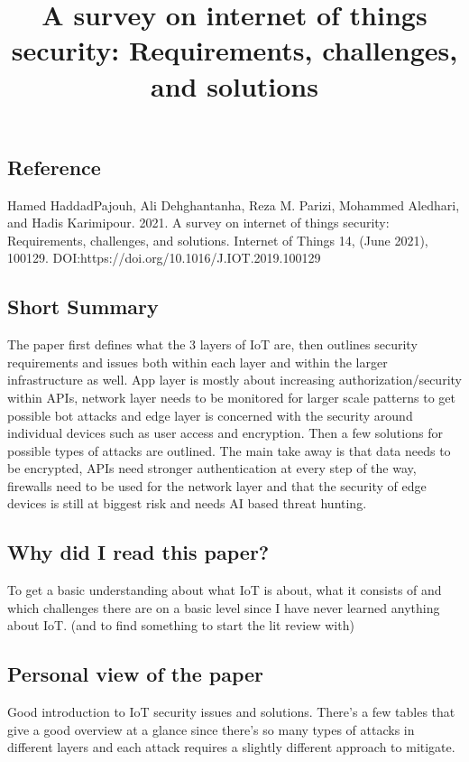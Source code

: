 \documentclass[11pt,a4paper]{article}
\title{A survey on internet of things security: Requirements, challenges, and solutions}
\author{}
\date{}
\begin{document}
\maketitle

\subsection*{Reference}
Hamed HaddadPajouh, Ali Dehghantanha, Reza M. Parizi, Mohammed Aledhari, and Hadis Karimipour. 2021. A survey on internet of things security: Requirements, challenges, and solutions. Internet of Things 14, (June 2021), 100129. DOI:https://doi.org/10.1016/J.IOT.2019.100129

\subsection*{Short Summary} 
The paper first defines what the 3 layers of IoT are, then outlines security requirements and issues both within each layer and within the larger infrastructure as well. App layer is mostly about increasing authorization/security within APIs, network layer needs to be monitored for larger scale patterns to get possible bot attacks and edge layer is concerned with the security around individual devices such as user access and encryption. Then a few solutions for possible types of attacks are outlined. The main take away is that data needs to be encrypted, APIs need stronger authentication at every step of the way, firewalls need to be used for the network layer and that the security of edge devices is still at biggest risk and needs AI based threat hunting.

\subsection*{Why did I read this paper?}
To get a basic understanding about what IoT is about, what it consists of and which challenges there are on a basic level since I have never learned anything about IoT. (and to find something to start the lit review with)

\subsection*{Personal view of the paper}
Good introduction to IoT security issues and solutions. There’s a few tables that give a good overview at a glance since there’s so many types of attacks in different layers and each attack requires a slightly different approach to mitigate.
\end{document}
